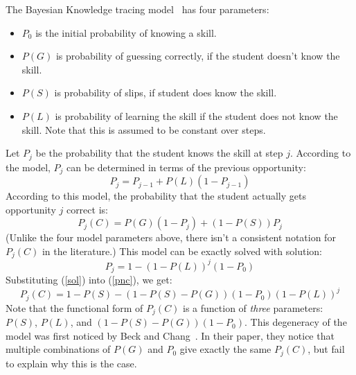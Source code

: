 \documentclass[11pt,letterpaper]{article}
\begin{document}
The Bayesian Knowledge tracing model~\cite{anderson} has four parameters:
%
\begin{itemize}
   \item $P_0$ is the initial probability of knowing a skill.
   \item $P(G)$ is probability of guessing correctly, if the student        
         doesn't know the skill.
   \item $P(S)$ is probability of slips, if student does know the skill.
   \item $P(L)$ is probability of learning the skill if the student 
         does not know the skill.  Note that this is assumed to 
         be constant over steps.
\end{itemize}
%
Let $P_j$ be the probability that the student knows the skill at 
step $j$. According to the model,  $P_j$ can
be determined in terms of the previous opportunity:
%
\begin{equation}
          P_j = P_{j-1} + P(L)\left(1-P_{j-1}\right)
\end{equation}
%
According to this model, the probability that the student actually gets
opportunity $j$ correct is:
%
\begin{equation}
         P_j(C) = P(G)\left(1-P_j\right) + \left(1-P(S)\right) P_j \label{pnc}
\end{equation}
%
(Unlike the four model parameters above, there isn't a consistent
notation for $P_j(C)$ in the literature.)
This model can be exactly solved with solution: 
%
\begin{equation}
            P_j = 1-\left(1-P(L)\right)^j\left(1-P_0\right)
	    \label{sol}
\end{equation}
%
%
Substituting (\ref{sol}) into (\ref{pnc}), we get:
%
\begin{equation}
         P_j(C) = 1-P(S) -\left(1-P(S)-P(G)\right) \left(1-P_0\right)
                   \left(1-P(L)\right)^j \label{pncsoln}
\end{equation}
%
Note that the functional form of $P_j(C)$ is a function of {\em three}
parameters:  $P(S)$, $P(L)$, and $\left(1-P(S)-P(G)\right) \left(1-P_0\right)$.
This degeneracy of the model was first noticed by Beck and 
Chang~\cite{beckchang}.  In their paper, they notice that multiple
combinations of $P(G)$ and $P_0$ give exactly the same $P_j(C)$, but
fail to explain why this is the case.
\end{document}
